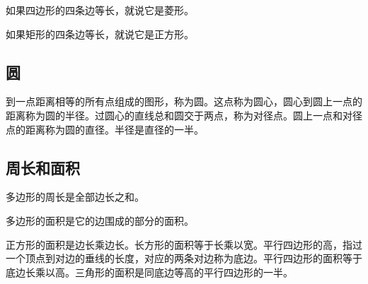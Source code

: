 \documentclass[12pt,UTF8]{ctexbook}
\begin{document}
如果四边形的四条边等长，就说它是菱形。

如果矩形的四条边等长，就说它是正方形。

\subsection{圆}

到一点距离相等的所有点组成的图形，称为圆。这点称为圆心，圆心到圆上一点的距离称为圆的半径。过圆心的直线总和圆交于两点，称为对径点。圆上一点和对径点的距离称为圆的直径。半径是直径的一半。

\subsection{周长和面积}

多边形的周长是全部边长之和。

多边形的面积是它的边围成的部分的面积。

正方形的面积是边长乘边长。长方形的面积等于长乘以宽。平行四边形的高，指过一个顶点到对边的垂线的长度，对应的两条对边称为底边。平行四边形的面积等于底边长乘以高。三角形的面积是同底边等高的平行四边形的一半。
\end{document}
